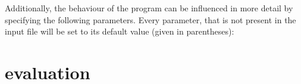 \documentclass[a4paper,twoside,12pt]{book}
\begin{document}
%
%
%

Additionally, the behaviour of the program can be influenced in more detail by specifying the following parameters. Every parameter, that is not present in the input file will be set to its default value (given in parentheses):

\chapter{evaluation}
\end{document}
